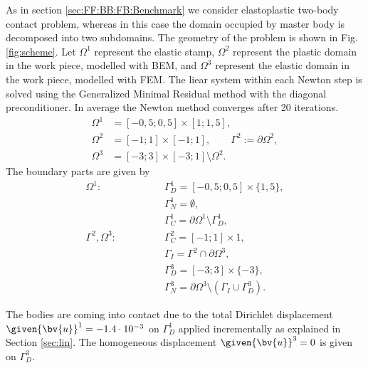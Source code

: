 As in section \ref{sec:FF:BB:FB:Benchmark} we consider elastoplastic two-body contact problem, whereas in this case the domain occupied  by master body is decomposed into two subdomains. The geometry of the problem is shown in Fig. \ref{fig:scheme}. Let $\Omega^1$ represent the elastic stamp, $\Omega^2$ represent the plastic domain in the work piece, modelled with BEM, and $\Omega^3$ represent the elastic domain in the work piece, modelled with FEM. The liear system within each Newton step is solved using the Generalized Minimal Residual method with the diagonal preconditioner. In average the Newton method converges after 20 iterations. 
\begin{align*}
\Omega^1&=[-0,5;0,5] \times [1;1,5], \\
\Omega^2&=[-1;1] \times [-1;1], \qquad \Gamma^2 := \partial \Omega^2, \\
\Omega^3&=[-3;3] \times [-3;1] \setminus \Omega^2. 
\end{align*}
The boundary parts are given by 
\begin{align*}
\Omega^1:           \qquad & \qquad \Gamma^1_D = [-0,5;0,5] \times \{1,5\}, \\
                           & \qquad \Gamma^1_N = \emptyset, \\
                           & \qquad \Gamma^1_C = \partial \Omega^1 \setminus \Gamma^1_D, \\
\Gamma^2, \Omega^3: \qquad & \qquad \Gamma^2_C = [-1;1] \times {1}, \\
                           & \qquad \Gamma_I = \Gamma^2 \cap \partial \Omega^3, \\
                           & \qquad \Gamma^3_D = [-3;3] \times \{-3\}, \\
                           & \qquad \Gamma^3_N = \partial \Omega^3 \setminus (\Gamma_I \cup \Gamma^3_D).
\end{align*}

The bodies are coming into contact due to the total Dirichlet displacement $\given{\bv{u}}^1 = -1.4 \cdot 10^{-3}$ on $\Gamma^1_D$ applied incrementally as explained in Section \ref{sec:lin}. The homogeneous displacement $\given{\bv{u}}^3 = 0$ is given on $\Gamma_D^3$.

